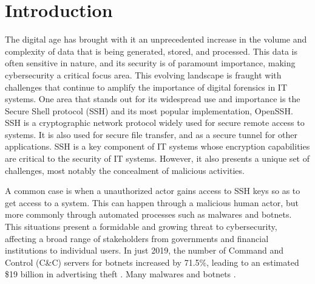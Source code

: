 \section{Introduction}\label{chap:introduction}



The digital age has brought with it an unprecedented increase in the volume and complexity of data that is being generated, stored, and processed. This data is often sensitive in nature, and its security is of paramount importance, making cybersecurity a critical focus area. This evolving landscape is fraught with challenges that continue to amplify the importance of digital forensics in IT systems. One area that stands out for its widespread use and importance is the Secure Shell protocol (SSH) and its most popular implementation, OpenSSH. SSH is a cryptographic network protocol widely used for secure remote access to systems. It is also used for secure file transfer, and as a secure tunnel for other applications. SSH is a key component of IT systems whose encryption capabilities are critical to the security of IT systems. However, it also presents a unique set of challenges, most notably the concealment of malicious activities.

A common case is when a unauthorized actor gains access to SSH keys so as to get access to a system. This can happen through a malicious human actor, but more commonly through automated processes such as malwares and botnets. This situations present a formidable and growing threat to cybersecurity, affecting a broad range of stakeholders from governments and financial institutions to individual users. In just 2019, the number of Command and Control (C\&C) servers for botnets increased by 71.5\%, leading to an estimated \$19 billion in advertising theft \cite{SSHBotnetInfect21}. Many malwares and botnets  \cite{SSHBotnetInfect21}. 

